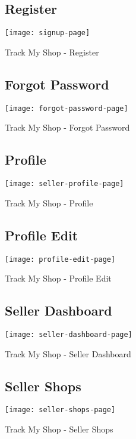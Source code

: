 \begin{figure}[h]
	\subsection{Register}
	\centering
	\texttt{[image: signup-page]}
	\caption{Track My Shop - Register}
\end{figure}
\newpage

\begin{figure}[h]
	\subsection{Forgot Password}
	\centering
	\texttt{[image: forgot-password-page]}
	\caption{Track My Shop - Forgot Password}
\end{figure}

\begin{figure}[h]
	\subsection{Profile}
	\centering
	\texttt{[image: seller-profile-page]}
	\caption{Track My Shop - Profile}
\end{figure}
\newpage

\begin{figure}[h]
	\subsection{Profile Edit}
	\centering
	\texttt{[image: profile-edit-page]}
	\caption{Track My Shop - Profile Edit}
\end{figure}


\begin{figure}[h]
	\subsection{Seller Dashboard}
	\centering
	\texttt{[image: seller-dashboard-page]}
	\caption{Track My Shop - Seller Dashboard}
\end{figure}
\newpage

\begin{figure}[h]
	\subsection{Seller Shops}
	\centering
	\texttt{[image: seller-shops-page]}
	\caption{Track My Shop - Seller Shops}
\end{figure}

